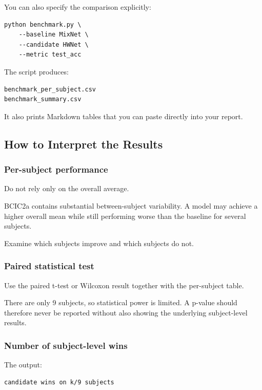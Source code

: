 \documentclass[
  10pt,
]{article}
\begin{document}
You can also specify the comparison explicitly:

\begin{verbatim}
python benchmark.py \
    --baseline MixNet \
    --candidate HWNet \
    --metric test_acc
\end{verbatim}

The script produces:

\begin{verbatim}
benchmark_per_subject.csv
benchmark_summary.csv
\end{verbatim}

It also prints Markdown tables that you can paste directly into your
report.

\subsection{How to Interpret the Results}\label{how-to-interpret-the-results}

\subsubsection{Per-subject performance}\label{per-subject-performance}

Do not rely only on the overall average.

BCIC2a contains substantial between-subject variability. A model may
achieve a higher overall mean while still performing worse than the
baseline for several subjects.

Examine which subjects improve and which subjects do not.

\subsubsection{Paired statistical test}\label{paired-statistical-test}

Use the paired t-test or Wilcoxon result together with the per-subject
table.

There are only 9 subjects, so statistical power is limited. A p-value
should therefore never be reported without also showing the underlying
subject-level results.

\subsubsection{Number of subject-level
wins}\label{number-of-subject-level-wins}

The output:

\begin{verbatim}
candidate wins on k/9 subjects
\end{verbatim}
\end{document}
